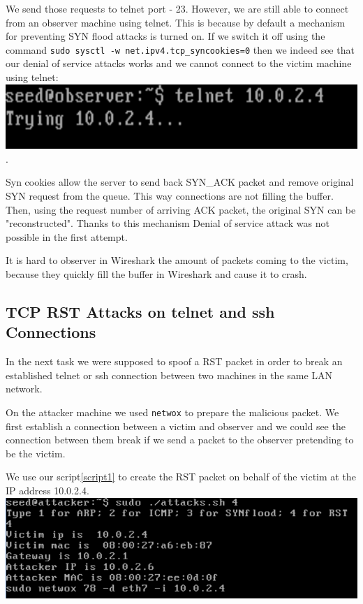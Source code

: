 \documentclass[12pt, a4paper, pdflatex]{article}
\begin{document}
We send those requests to telnet port - 23. However, we are still able to connect from an observer machine using telnet. This is because by default a mechanism for preventing SYN flood attacks is turned on. If we switch it off using the command \texttt{sudo sysctl -w net.ipv4.tcp\_syncookies=0} then we indeed see that our denial of service attacks works and we cannot connect to the victim machine using telnet:\\
\includegraphics[width=.95\textwidth]{gfx/syn-telnet.png}.

Syn cookies allow the server to send back SYN\_ACK packet and remove original SYN request from the queue. This way connections are not filling the buffer. Then, using the request number of arriving ACK packet, the original SYN can be "reconstructed". Thanks to this mechanism Denial of service attack was not possible in the first attempt.

It is hard to observer in Wireshark the amount of packets coming to the victim, because they quickly fill the buffer in Wireshark and cause it to crash.

\subsection{TCP RST Attacks on telnet and ssh Connections}

In the next task we were supposed to spoof a RST packet in order to break an established telnet or ssh connection between two machines in the same LAN network.

On the attacker machine we used \texttt{netwox} to prepare the malicious packet. We first establish a connection between a victim and observer and we could see the connection between them break if we send a packet to the observer pretending to be the victim.

We use our script\ref{script1} to create the RST packet on behalf of the victim at the IP address 10.0.2.4.\\
\includegraphics[width=.95\textwidth]{gfx/rst-attack.png}
\end{document}
